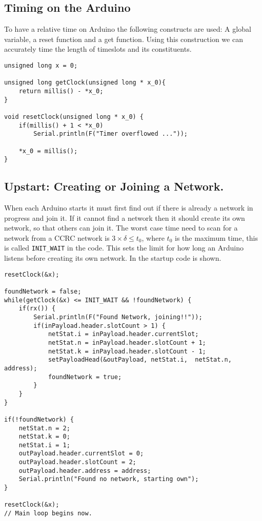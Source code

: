 \subsection{Timing on the Arduino}
To have a relative time on Arduino the following constructs are used: A global variable, a reset function and a get function. 
Using this construction we can accurately time the length of timeslots and its constituents. 
\begin{lstlisting}[style=customc,caption={The variable and functions used to implement timing.},label={lst:ccrc:timing}]
unsigned long x = 0;

unsigned long getClock(unsigned long * x_0){
    return millis() - *x_0; 
}

void resetClock(unsigned long * x_0) {
    if(millis() + 1 < *x_0)
        Serial.println(F("Timer overflowed ..."));

    *x_0 = millis();
}
\end{lstlisting}

\subsection{Upstart: Creating or Joining a Network.}
When each Arduino starts it must first find out if there is already a network in progress and join it. 
If it cannot find a network then it should create its own network, so that others can join it. 
The worst case time need to scan for a network from a CCRC network is $3 \times \delta \leq t_0$, where $t_0$ is the maximum time, this is called \texttt{INIT\_WAIT} in the code. 
This sets the limit for how long an Arduino listens before creating its own network. 
In  the startup code is shown. 

\begin{lstlisting}[style=customc,caption={Startup, if a network is found join it, if not create one.},label={lst:ccrc:startup}]
resetClock(&x);

foundNetwork = false;
while(getClock(&x) <= INIT_WAIT && !foundNetwork) {
    if(rx()) {
        Serial.println(F("Found Network, joining!!"));
        if(inPayload.header.slotCount > 1) {
            netStat.i = inPayload.header.currentSlot;
            netStat.n = inPayload.header.slotCount + 1;
            netStat.k = inPayload.header.slotCount - 1;
            setPayloadHead(&outPayload, netStat.i,  netStat.n, address);
            foundNetwork = true;
        }
    }
}

if(!foundNetwork) {
    netStat.n = 2;
    netStat.k = 0;
    netStat.i = 1; 
    outPayload.header.currentSlot = 0;
    outPayload.header.slotCount = 2;
    outPayload.header.address = address;
    Serial.println("Found no network, starting own");
}

resetClock(&x);
// Main loop begins now.
\end{lstlisting}

